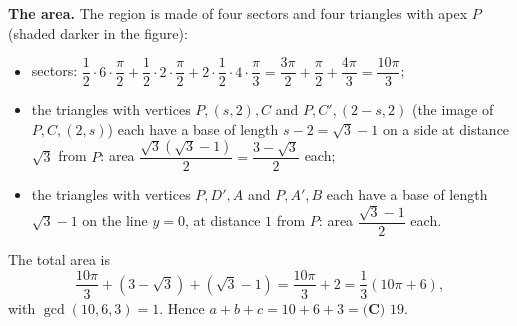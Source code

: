 \textbf{The area.} The region is made of four sectors and four triangles with apex $P$ (shaded darker in the figure):
\begin{itemize}
\item sectors: $\dfrac12\cdot6\cdot\dfrac{\pi}{2}+\dfrac12\cdot2\cdot\dfrac{\pi}{2}+2\cdot\dfrac12\cdot4\cdot\dfrac{\pi}{3}=\dfrac{3\pi}{2}+\dfrac{\pi}{2}+\dfrac{4\pi}{3}=\dfrac{10\pi}{3}$;
\item the triangles with vertices $P,(s,2),C$ and $P,C',(2-s,2)$ (the image of $P,C,(2,s)$) each have a base of length $s-2=\sqrt3-1$ on a side at distance $\sqrt3$ from $P$: area $\dfrac{\sqrt3\left(\sqrt3-1\right)}{2}=\dfrac{3-\sqrt3}{2}$ each;
\item the triangles with vertices $P,D',A$ and $P,A',B$ each have a base of length $\sqrt3-1$ on the line $y=0$, at distance $1$ from $P$: area $\dfrac{\sqrt3-1}{2}$ each.
\end{itemize}
The total area is
\[\dfrac{10\pi}{3}+\left(3-\sqrt3\right)+\left(\sqrt3-1\right)=\dfrac{10\pi}{3}+2=\dfrac{1}{3}(10\pi+6),\]
with $\gcd(10,6,3)=1$. Hence $a+b+c=10+6+3=\boxed{\textbf{(C) }19}$.
